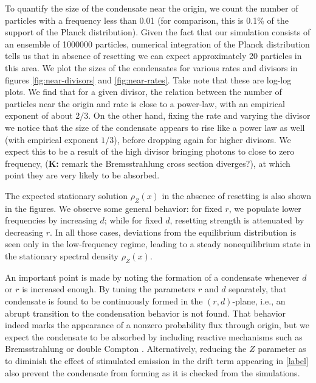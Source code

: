 \documentclass[a4paper,12pt,reqno,superscriptaddress,nofootinbib]{article}
\theoremstyle{plain}
\theoremstyle{definition}
\theoremstyle{remark}
\newcommand{\0}{^{(0)}}
\newcommand{\1}{^{(1)}}
\newcommand{\2}{^{(2)}}
\begin{document}
To quantify the size of the condensate near the origin, we count the number of particles with a frequency less than 0.01 (for comparison, this is 0.1\% of the support of the Planck distribution). Given the fact that our simulation consists of an ensemble of \num{1000000} particles, numerical integration of the Planck distribution tells us that in absence of resetting we can expect approximately 20 particles in this area. We plot the sizes of the condensates for various rates and divisors in figures \ref{fig:near-divisors} and \ref{fig:near-rates}. Take note that these are log-log plots. We find that for a given divisor, the relation between the number of particles near the origin and rate is close to a power-law, with an empirical exponent of about $2/3$. On the other hand, fixing the rate and varying the divisor we notice that the size of the condensate appears to rise like a power law as well (with empirical exponent $1/3$), before dropping again for higher divisors. We expect this to be a result of the high divisor bringing photons to close to zero frequency, (\textbf{K:} remark the Bremsstrahlung cross section diverges?), at which point they are very likely to be absorbed.

The expected stationary solution $\rho_Z(x)$ in the absence of resetting is also shown in the figures. We observe some general behavior: for fixed $r$, we populate lower frequencies by increasing $d$; while for fixed $d$, resetting strength is attenuated by decreasing $r$. In all those cases, deviations from the equilibrium distribution is seen only in the low-frequency regime, leading to a steady nonequilibrium state in the stationary spectral density $\rho_Z(x)$.

An important point is made by noting the formation of a condensate whenever $d$ or $r$ is increased enough. By tuning the parameters $r$ and $d$ separately, that condensate is found to be continuously formed in the $(r,d)$-plane, i.e., an abrupt transition to the condensation behavior is not found. That behavior indeed marks the appearance of a nonzero probability flux through origin, but we expect the condensate to be absorbed by including reactive mechanisms such as Bremsstrahlung or double Compton \cite{paper2}. Alternatively, reducing the $Z$ parameter as to diminish the effect of stimulated emission in the drift term appearing in \eqref{label} also prevent the condensate from forming as it is checked from the simulations.
\end{document}
